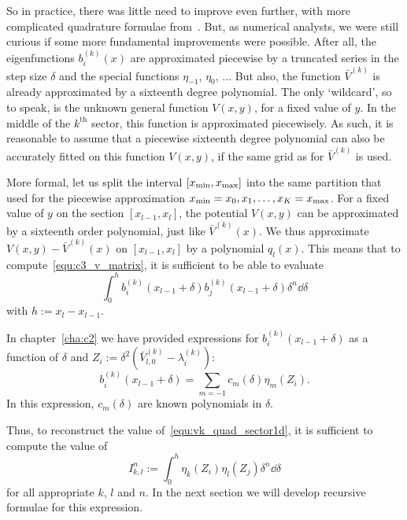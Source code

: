 So in practice, there was little need to improve even further, with more complicated quadrature formulae from~\cite{ixaru_operations_1997,kim_quadrature_2002,conte_modified_2016}. But, as numerical analysts, we were still curious if some more fundamental improvements were possible. After all, the eigenfunctions $b_i^{(k)}(x)$ are approximated piecewise by a truncated series in the step size $\delta$ and the special functions $\eta_{-1}$, $\eta_{0}$, $\dots$ But also, the function $\bar{V}^{(k)}$ is already approximated by a sixteenth degree polynomial. The only `wildcard', so to speak, is the unknown general function $V(x, y)$, for a fixed value of $y$. In the middle of the $k^\text{th}$ sector, this function is approximated piecewisely. As such, it is reasonable to assume that a piecewise sixteenth degree polynomial can also be accurately fitted on this function $V(x, y)$, if the same grid as for $\bar{V}^{(k)}$ is used.

More formal, let us split the interval $[{x_{\text{min}}}, {x_{\text{max}}}]$ into the same partition that  used for the piecewise approximation ${x_{\text{min}}} = x_0, x_1, \dots, x_K = {x_{\text{max}}}$. For a fixed value of $y$ on the section $[x_{l-1}, x_l]$, the potential $V(x, y)$ can be approximated by a sixteenth order polynomial, just like $\bar{V}^{(k)}(x)$. We thus approximate $V(x, y) - \bar{V}^{(k)}(x)$ on $[x_{l-1}, x_l]$ by a polynomial $q_l(x)$. This means that to compute~\eqref{equ:c3_v_matrix}, it is sufficient to be able to evaluate
\begin{equation}\label{equ:vk_quad_sector1d}
  \int_{0}^{h} b_i^{(k)}(x_{l-1}+\delta)b_j^{(k)}(x_{l-1}+\delta)\delta^n\dd \delta
\end{equation}
with $h := x_l-x_{l-1}$.

In chapter~\ref{cha:c2} we have provided expressions for $b_i^{(k)}(x_{l-1}+\delta)$ as a function of $\delta$ and $Z_i := \delta^2\left(\bar{V}^{(k)}_{l,0}- \lambda^{(k)}_i\right)$:
$$
  b_i^{(k)}(x_{l-1}+\delta) = \sum_{m=-1} c_m(\delta) \eta_m(Z_i)\text{.}
$$
In this expression, $c_m(\delta)$ are known polynomials in $\delta$.

Thus, to reconstruct the value of~\eqref{equ:vk_quad_sector1d}, it is sufficient to compute the value of
\begin{equation}\label{equ:c3_eta_eta_inegral}
  I_{k,l}^n := \int_0^h \eta_k(Z_i) \eta_l(Z_j) \delta^n \dd \delta
\end{equation}
for all appropriate $k$, $l$ and $n$. In the next section we will develop recursive formulae for this expression.

